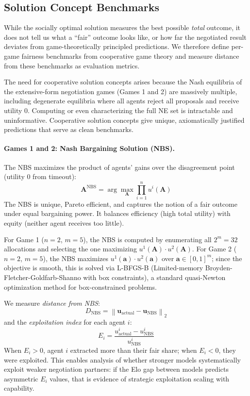 \subsection{Solution Concept Benchmarks}
\label{sec:solution_concepts}

While the socially optimal solution measures the best possible \emph{total} outcome, it does not tell us what a ``fair'' outcome looks like, or how far the negotiated result deviates from game-theoretically principled predictions.
We therefore define per-game fairness benchmarks from cooperative game theory and measure distance from these benchmarks as evaluation metrics.

The need for cooperative solution concepts arises because the Nash equilibria of the extensive-form negotiation games (Games 1 and 2) are massively multiple, including degenerate equilibria where all agents reject all proposals and receive utility 0.
Computing or even characterizing the full NE set is intractable and uninformative.
Cooperative solution concepts give unique, axiomatically justified predictions that serve as clean benchmarks.

\paragraph{Games 1 and 2: Nash Bargaining Solution (NBS).}
The NBS maximizes the product of agents' gains over the disagreement point (utility 0 from timeout):
\begin{equation}
    \bm{A}^{\text{NBS}} = \arg\max_{\bm{A}} \prod_{i=1}^{n} u^i(\bm{A})
\end{equation}
The NBS is unique, Pareto efficient, and captures the notion of a fair outcome under equal bargaining power.
It balances efficiency (high total utility) with equity (neither agent receives too little).

For Game 1 ($n=2$, $m=5$), the NBS is computed by enumerating all $2^m = 32$ allocations and selecting the one maximizing $u^1(\bm{A}) \cdot u^2(\bm{A})$.
For Game 2 ($n=2$, $m=5$), the NBS maximizes $u^1(\bm{a}) \cdot u^2(\bm{a})$ over $\bm{a} \in [0,1]^m$; since the objective is smooth, this is solved via L-BFGS-B (Limited-memory Broyden-Fletcher-Goldfarb-Shanno with box constraints), a standard quasi-Newton optimization method for box-constrained problems.

We measure \emph{distance from NBS}:
\begin{equation}
    D_{\text{NBS}} = \left\|\bm{u}_{\text{actual}} - \bm{u}_{\text{NBS}}\right\|_2
\end{equation}
and the \emph{exploitation index} for each agent $i$:
\begin{equation}
    E_i = \frac{u^i_{\text{actual}} - u^i_{\text{NBS}}}{u^i_{\text{NBS}}}
\end{equation}
When $E_i > 0$, agent $i$ extracted more than their fair share; when $E_i < 0$, they were exploited.
This enables analysis of whether stronger models systematically exploit weaker negotiation partners: if the Elo gap between models predicts asymmetric $E_i$ values, that is evidence of strategic exploitation scaling with capability.

